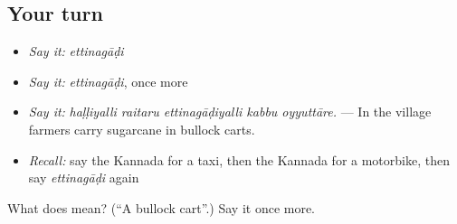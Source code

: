 \subsection*{Your turn}
\begin{itemize}
\raggedright
  \item \emph{Say it:} \emph{ettinagāḍi}
  \item \emph{Say it:} \emph{ettinagāḍi}, once more
  \item \emph{Say it:} \emph{haḷḷiyalli raitaru ettinagāḍiyalli kabbu oyyuttāre.} — In the village farmers carry sugarcane in bullock carts.
  \item \emph{Recall:} say the Kannada for a taxi, then the Kannada for a motorbike, then say \emph{ettinagāḍi} again
\end{itemize}

\begin{tcolorbox}[breakable,colback=teal!4,colframe=teal!35!black,title={Before you move on}]
What does  mean? (\textquotedblleft{}A bullock cart\textquotedblright{}.) Say it once more.
\end{tcolorbox}
